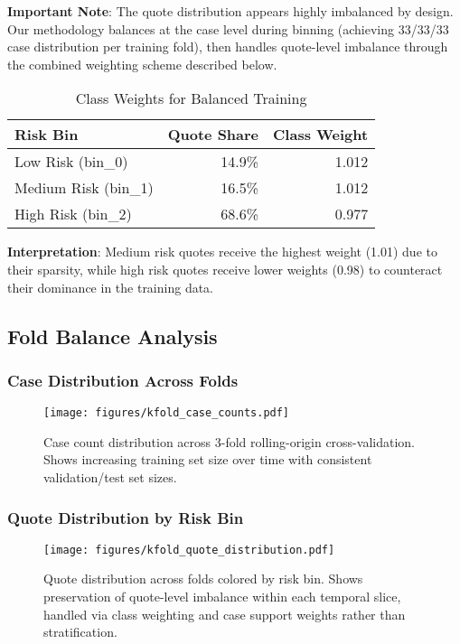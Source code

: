 \documentclass[11pt]{article}
\begin{document}
\textbf{Important Note}: The quote distribution appears highly imbalanced by design. Our methodology balances at the case level during binning (achieving 33/33/33 case distribution per training fold), then handles quote-level imbalance through the combined weighting scheme described below.

\begin{table}[H]
\centering
\caption{Class Weights for Balanced Training}
\begin{tabular}{lrr}
\toprule
\textbf{Risk Bin} & \textbf{Quote Share} & \textbf{Class Weight} \\
\midrule
Low Risk (bin\_0) & 14.9\% & 1.012 \\
Medium Risk (bin\_1) & 16.5\% & 1.012 \\
High Risk (bin\_2) & 68.6\% & 0.977 \\
\bottomrule
\end{tabular}
\end{table}

\textbf{Interpretation}: Medium risk quotes receive the highest weight (1.01) due to their sparsity, while high risk quotes receive lower weights (0.98) to counteract their dominance in the training data.

\subsection{Fold Balance Analysis}

\subsubsection{Case Distribution Across Folds}

\begin{figure}[H]
\centering
\texttt{[image: figures/kfold\_case\_counts.pdf]}
\caption{Case count distribution across 3-fold rolling-origin cross-validation. Shows increasing training set size over time with consistent validation/test set sizes.}
\end{figure}

\subsubsection{Quote Distribution by Risk Bin}

\begin{figure}[H]
\centering
\texttt{[image: figures/kfold\_quote\_distribution.pdf]}
\caption{Quote distribution across folds colored by risk bin. Shows preservation of quote-level imbalance within each temporal slice, handled via class weighting and case support weights rather than stratification.}
\end{figure}
\end{document}
